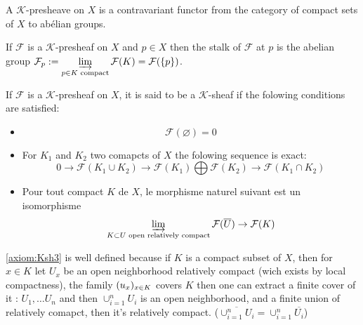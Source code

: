 \begin{definition}
    \label{def:K_pre_sheaves}
    A $\mathcal{K}$-presheave on $X$ is a contravariant functor from the category of compact sets of $X$ to abélian groups.
\end{definition}

\begin{definition}
    \label{def:K_stalk}
    If $\mathcal{F}$ is a $\mathcal{K}$-presheaf on $X$ and $p\in X$ then the stalk of $\mathcal{F}$ at $p$ is the abelian group $\mathcal{F}_p:=\varinjlim\limits_{p\in K\text{ compact}}\mathcal{F}(K)=\mathcal{F}(\{p\})$.  
\end{definition}

\begin{definition}
    \label{def:K_sheaves}
    If $\mathcal{F}$ is a $\mathcal{K}$-presheaf on $X$, it is said to be a $\mathcal{K}$-sheaf if the folowing conditions are satisfied:\begin{itemize}
    \item\begin{equation}\label{axiom:Ksh1}
        \mathcal{F}(\varnothing)=0
    \end{equation}
    \item For $K_1$ and $K_2$ two comapcts of $X$ the folowing sequence is exact:\begin{equation}\label{axiom:Ksh2}
         0\to\mathcal{F}(K_1\cup K_2)\to \mathcal{F}(K_1)\bigoplus\mathcal{F}(K_2)\to \mathcal{F}(K_1\cap K_2) 
    \end{equation}
    \item Pour tout compact $K$ de $X$, le morphisme naturel suivant est un isomorphisme \begin{equation}\label{axiom:Ksh3}
        \varinjlim\limits_{K\subset U\text{ open relatively compact}}\mathcal{F}(\overline{U})\to \mathcal{F}(K)
    \end{equation}
\end{itemize}
\end{definition}

\begin{remark}
    \eqref{axiom:Ksh3} is well defined because if $K$ is a compact subset of $X$, then for $x\in K$ let $U_x$ be an open neighborhood relatively compact (wich exists by local compactness), the family $(u_x)_{x\in K}$ covers $K$ then one can extract a finite cover of it : $U_1,\ldots U_n$ and then $\cup_{i=1}^n U_i$ is an open neighborhood, and a finite union of relatively comapct, then it's relatively compact. ($\overline{\cup_{i=1}^n U_i}=\cup_{i=1}^n \overline{U_i}$)
\end{remark}


